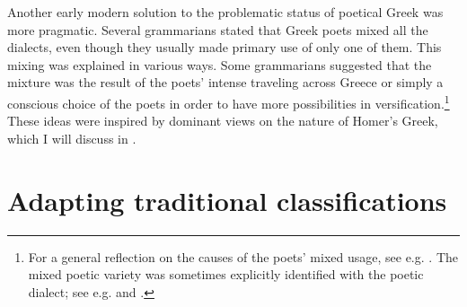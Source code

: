 Another early modern solution to the problematic status of poetical Greek was more pragmatic. Several grammarians stated that Greek poets mixed all the dialects, even though they usually made primary use of only one of them. This mixing was explained in various ways. Some grammarians suggested that the mixture was the result of the poets’ intense traveling across Greece or simply a conscious choice of the poets in order to have more possibilities in versification.\footnote{For a general reflection on the causes of the poets’ mixed usage, see e.g. \citet[*.3\textsc{\textsuperscript{r}}–*.4\textsc{\textsuperscript{r}}]{Gottleber1765}. The mixed poetic variety was sometimes explicitly identified with the poetic dialect; see e.g. \citet[111]{Bayly1756} and \citet[198]{Peternader1776}.} These ideas were inspired by dominant views on the nature of Homer’s Greek, which I will discuss in . 

\section{Adapting traditional classifications}\label{sec:2.8}

